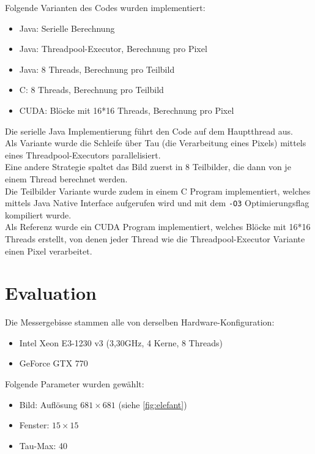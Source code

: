 \documentclass[%
  a4paper,%
  12pt,%
  style=screen, %
  oneside,
  blue,%
  ]{tubsartcl}
\begin{document}
Folgende Varianten des Codes wurden implementiert:
\begin{itemize}
  \setlength{\itemsep}{-5pt}
  \item Java: Serielle Berechnung
  \item Java: Threadpool-Executor, Berechnung pro Pixel
  \item Java: 8 Threads, Berechnung pro Teilbild
  \item C: 8 Threads, Berechnung pro Teilbild
  \item CUDA: Blöcke mit 16*16 Threads, Berechnung pro Pixel
\end{itemize}

Die serielle Java Implementierung führt den Code auf dem Hauptthread aus. \\
Als Variante wurde die Schleife über Tau (die Verarbeitung eines Pixels) mittels eines Threadpool-Executors
parallelisiert.\\
Eine andere Strategie spaltet das Bild zuerst in 8 Teilbilder, die dann von je einem Thread berechnet werden.\\
Die Teilbilder Variante wurde zudem in einem C Program implementiert, welches mittels Java Native Interface aufgerufen
wird und mit dem \texttt{-O3} Optimierungsflag kompiliert wurde. \\
Als Referenz wurde ein CUDA Program implementiert, welches Blöcke mit 16*16 Threads erstellt, von denen jeder Thread wie
die Threadpool-Executor Variante einen Pixel verarbeitet.

\section{Evaluation}
%

Die Messergebisse stammen alle von derselben Hardware-Konfiguration:  
  \begin{itemize}
  \setlength{\itemsep}{-5pt}
    \item Intel Xeon E3-1230 v3 (3,30GHz, 4 Kerne, 8 Threads)
    \item GeForce GTX 770
  \end{itemize}
  
Folgende Parameter wurden gewählt:
\begin{itemize}
  \setlength{\itemsep}{-5pt}
  \item Bild: Auflösung $681\times681$ (siehe \autoref{fig:elefant})
  \item Fenster: $15\times15$
  \item Tau-Max: 40
\end{itemize}   
\end{document}
